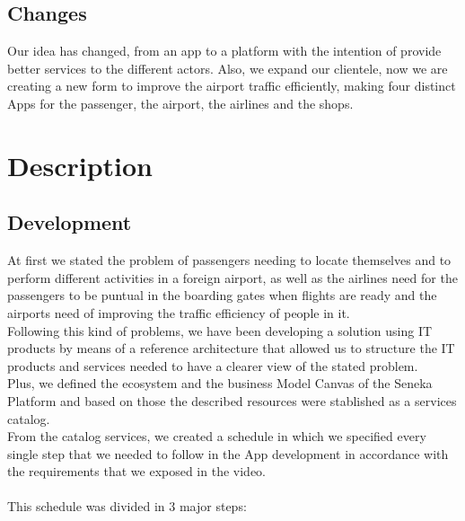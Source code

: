 \documentclass[12pt]{article}
\begin{document}
\subsection{Changes}
Our idea has changed, from an app to a platform with the intention of provide better services to the different actors. Also, we expand our clientele, now we are creating a new form to improve the airport traffic efficiently, making four distinct Apps for the passenger, the airport, the airlines and the shops.\\

\section{Description}

\subsection{Development}

At first we stated the problem of passengers needing to locate themselves and to perform different activities in a foreign airport, as well as the airlines need for the passengers to be puntual in the boarding gates when flights are ready and the airports need of improving the traffic efficiency of people in it.\\

Following this kind of problems, we have been developing a solution using IT products by means of a reference architecture that allowed us to structure the IT products and services needed to have a clearer view of the stated problem.\\
Plus, we defined the ecosystem and the business Model Canvas of the Seneka Platform and based on those the described resources were stablished as a services catalog.\\

From the catalog services, we created a schedule in which we specified every single step that we needed to follow in the App development in accordance with the requirements that we exposed in the video.\\\\

This schedule was divided in 3 major steps:
\end{document}
